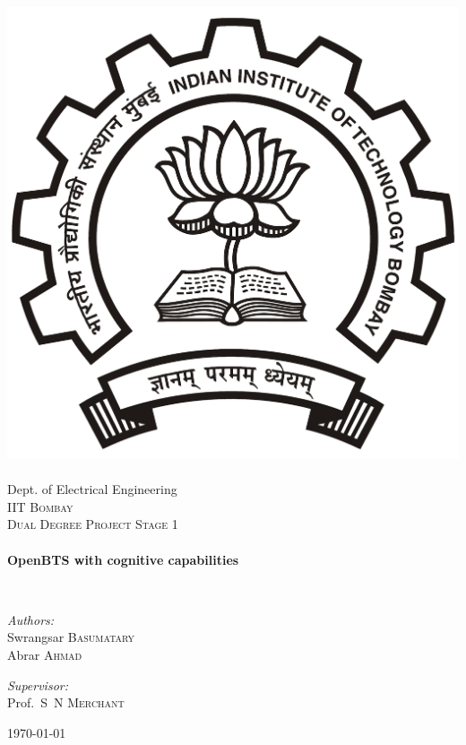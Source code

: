 \begin{titlepage}
\begin{center}

\includegraphics[width=0.23\textheight]{iitbLogo}~\\[1cm]
Dept. of Electrical Engineering\\[0.3cm]
\textsc{\LARGE IIT Bombay}\\[1.5cm]

\textsc{\Large Dual Degree Project Stage 1}\\[0.5cm]

\HRule \\[0.4cm]
{ \huge \bfseries OpenBTS with cognitive capabilities\\[0.4cm] }

\HRule \\[1.5cm]

\begin{minipage}{0.4\textwidth}
\begin{flushleft} \large
\emph{Authors:}\\
Swrangsar \textsc{Basumatary}\\
Abrar \textsc{Ahmad}
\end{flushleft}
\end{minipage}
\begin{minipage}{0.4\textwidth}
\begin{flushright} \large
\emph{Supervisor:} \\
Prof.~S~N \textsc{Merchant}
\end{flushright}
\end{minipage}

\vfill

{\large \today}

\end{center}
\end{titlepage}
